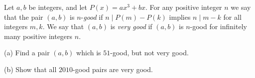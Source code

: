 Let $a, b$ be integers, and let $P(x) = ax^3 + bx$. For any positive integer $n$ we say that the pair $(a, b)$ is $n$-\emph{good} if $n \mid P(m) - P(k)$ implies $n \mid m - k$ for all integers $m, k$. We say that $(a, b)$ is \emph{very good} if $(a, b)$ is $n$-good for infinitely many positive integers $n$.

(a) Find a pair $(a, b)$ which is $51$-good, but not very good.

(b) Show that all $2010$-good pairs are very good.

